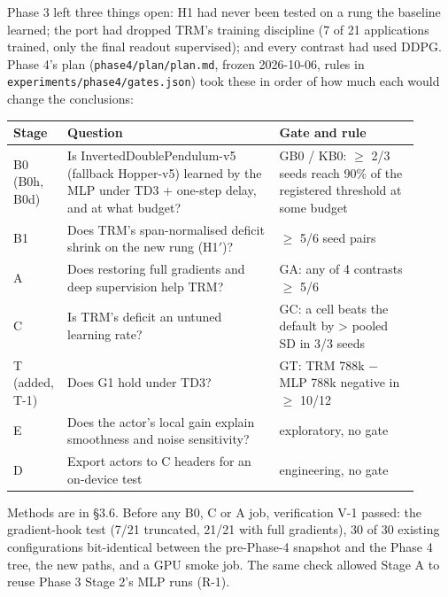 \documentclass[11pt]{article}
\begin{document}
Phase 3 left three things open: H1 had never been tested on a rung the baseline learned; the port had dropped TRM's training discipline (7 of 21 applications trained, only the final readout supervised); and every contrast had used DDPG. Phase 4's plan (\texttt{phase4/\allowbreak{}plan/\allowbreak{}plan.\allowbreak{}md}, frozen 2026-10-06, rules in \texttt{experiments/\allowbreak{}phase4/\allowbreak{}gates.\allowbreak{}json}) took these in order of how much each would change the conclusions:



\begin{center}\small\begin{tabular}{>{\raggedright\arraybackslash}p{0.069\linewidth}>{\raggedright\arraybackslash}p{0.503\linewidth}>{\raggedright\arraybackslash}p{0.334\linewidth}}
\toprule
Stage & Question & Gate and rule \\
\midrule
B0 (B0h, B0d) & Is InvertedDoublePendulum-v5 (fallback Hopper-v5) learned by the MLP under TD3 + one-step delay, and at what budget? & GB0 / KB0: $\geq$ 2/3 seeds reach 90\% of the registered threshold at some budget \\
B1 & Does TRM's span-normalised deficit shrink on the new rung (H1$'$)? & $\geq$ 5/6 seed pairs \\
A & Does restoring full gradients and deep supervision help TRM? & GA: any of 4 contrasts $\geq$ 5/6 \\
C & Is TRM's deficit an untuned learning rate? & GC: a cell beats the default by > pooled SD in 3/3 seeds \\
T (added, T-1) & Does G1 hold under TD3? & GT: TRM 788k $-$ MLP 788k negative in $\geq$ 10/12 \\
E & Does the actor's local gain explain smoothness and noise sensitivity? & exploratory, no gate \\
D & Export actors to C headers for an on-device test & engineering, no gate \\
\bottomrule
\end{tabular}\end{center}



Methods are in \S{}3.6. Before any B0, C or A job, verification V-1 passed: the gradient-hook test (7/21 truncated, 21/21 with full gradients), 30 of 30 existing configurations bit-identical between the pre-Phase-4 snapshot and the Phase 4 tree, the new paths, and a GPU smoke job. The same check allowed Stage A to reuse Phase 3 Stage 2's MLP runs (R-1).
\end{document}
